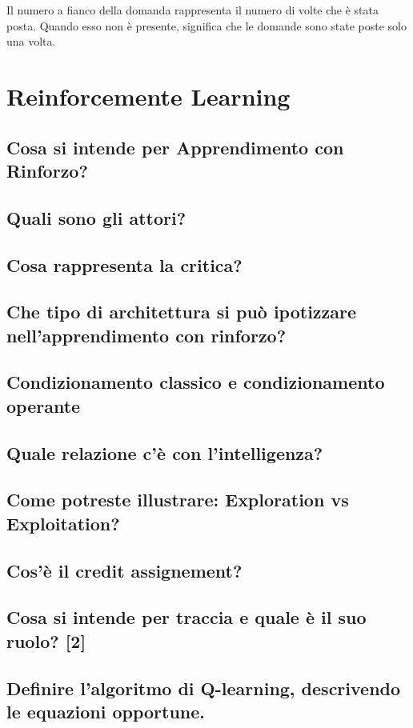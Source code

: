 \documentclass[\main/main.tex]{subfiles}
\begin{document}
Il numero a fianco della domanda rappresenta il numero di volte che è stata posta. Quando esso non è presente, significa che le domande sono state poste solo una volta.

\section{Reinforcemente Learning}

\subsection{Cosa si intende per Apprendimento con Rinforzo?}
\subsection{Quali sono gli attori?}
\subsection{Cosa rappresenta la critica?}
\subsection{Che tipo di architettura si può ipotizzare nell'apprendimento con rinforzo?}
\subsection{Condizionamento classico e condizionamento operante}
\subsection{Quale relazione c'è con l'intelligenza?}
\subsection{Come potreste illustrare: Exploration vs Exploitation?}
\subsection{Cos'è il credit assignement?}
\subsection{Cosa si intende per traccia e quale è il suo ruolo? [2]}
\subsection{Definire l’algoritmo di Q-learning, descrivendo le equazioni opportune.}
\end{document}
